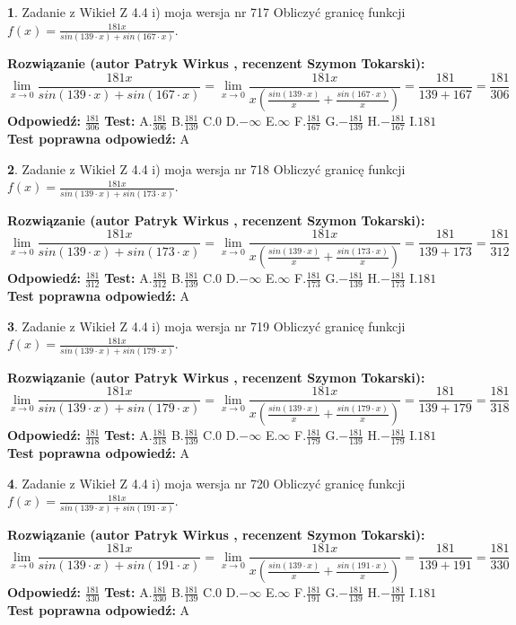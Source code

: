 \documentclass[12pt, a4paper]{article}
\theoremstyle{definition} %
\newtheorem{zad}{}
\newcommand{\zadStart}[1]{\begin{zad}#1\newline}
\newcommand{\zadStop}{\end{zad}}
\newcommand{\rozwStart}[2]{\noindent \textbf{Rozwiązanie (autor #1 , recenzent #2): }\newline}
\newcommand{\rozwStop}{\newline}
\newcommand{\odpStart}{\noindent \textbf{Odpowiedź:}\newline}
\newcommand{\odpStop}{\newline}
\newcommand{\testStart}{\noindent \textbf{Test:}\newline}
\newcommand{\testStop}{\newline}
\newcommand{\kluczStart}{\noindent \textbf{Test poprawna odpowiedź:}\newline}
\newcommand{\kluczStop}{\newline}
\begin{document}
\zadStart{Zadanie z Wikieł Z 4.4 i) moja wersja nr 717}
Obliczyć granicę funkcji $f(x)=\frac{181x}{sin(139\cdot x) +sin(167\cdot x)}$.
\zadStop
\rozwStart{Patryk Wirkus}{Szymon Tokarski}
$$\lim\limits_{x\to 0}\frac{181x}{sin(139\cdot x) +sin(167\cdot x)}=\lim\limits_{x\to 0}\frac{181x}{x(\frac{sin(139\cdot x)}{x}+\frac{sin(167\cdot x)}{x})}=\frac{181}{139+167} = \frac{181}{306}$$
\rozwStop
\odpStart
$\frac{181}{306}$
\odpStop
\testStart
A.$\frac{181}{306}$
B.$\frac{181}{139}$
C.$0$
D.$-\infty$
E.$\infty$
F.$\frac{181}{167}$
G.$-\frac{181}{139}$
H.$-\frac{181}{167}$
I.$181$
\testStop
\kluczStart
A
\kluczStop



\zadStart{Zadanie z Wikieł Z 4.4 i) moja wersja nr 718}
Obliczyć granicę funkcji $f(x)=\frac{181x}{sin(139\cdot x) +sin(173\cdot x)}$.
\zadStop
\rozwStart{Patryk Wirkus}{Szymon Tokarski}
$$\lim\limits_{x\to 0}\frac{181x}{sin(139\cdot x) +sin(173\cdot x)}=\lim\limits_{x\to 0}\frac{181x}{x(\frac{sin(139\cdot x)}{x}+\frac{sin(173\cdot x)}{x})}=\frac{181}{139+173} = \frac{181}{312}$$
\rozwStop
\odpStart
$\frac{181}{312}$
\odpStop
\testStart
A.$\frac{181}{312}$
B.$\frac{181}{139}$
C.$0$
D.$-\infty$
E.$\infty$
F.$\frac{181}{173}$
G.$-\frac{181}{139}$
H.$-\frac{181}{173}$
I.$181$
\testStop
\kluczStart
A
\kluczStop



\zadStart{Zadanie z Wikieł Z 4.4 i) moja wersja nr 719}
Obliczyć granicę funkcji $f(x)=\frac{181x}{sin(139\cdot x) +sin(179\cdot x)}$.
\zadStop
\rozwStart{Patryk Wirkus}{Szymon Tokarski}
$$\lim\limits_{x\to 0}\frac{181x}{sin(139\cdot x) +sin(179\cdot x)}=\lim\limits_{x\to 0}\frac{181x}{x(\frac{sin(139\cdot x)}{x}+\frac{sin(179\cdot x)}{x})}=\frac{181}{139+179} = \frac{181}{318}$$
\rozwStop
\odpStart
$\frac{181}{318}$
\odpStop
\testStart
A.$\frac{181}{318}$
B.$\frac{181}{139}$
C.$0$
D.$-\infty$
E.$\infty$
F.$\frac{181}{179}$
G.$-\frac{181}{139}$
H.$-\frac{181}{179}$
I.$181$
\testStop
\kluczStart
A
\kluczStop



\zadStart{Zadanie z Wikieł Z 4.4 i) moja wersja nr 720}
Obliczyć granicę funkcji $f(x)=\frac{181x}{sin(139\cdot x) +sin(191\cdot x)}$.
\zadStop
\rozwStart{Patryk Wirkus}{Szymon Tokarski}
$$\lim\limits_{x\to 0}\frac{181x}{sin(139\cdot x) +sin(191\cdot x)}=\lim\limits_{x\to 0}\frac{181x}{x(\frac{sin(139\cdot x)}{x}+\frac{sin(191\cdot x)}{x})}=\frac{181}{139+191} = \frac{181}{330}$$
\rozwStop
\odpStart
$\frac{181}{330}$
\odpStop
\testStart
A.$\frac{181}{330}$
B.$\frac{181}{139}$
C.$0$
D.$-\infty$
E.$\infty$
F.$\frac{181}{191}$
G.$-\frac{181}{139}$
H.$-\frac{181}{191}$
I.$181$
\testStop
\kluczStart
A
\kluczStop
\end{document}
